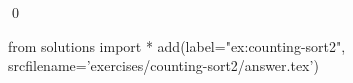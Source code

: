 
\begin{ex} 
  \label{ex:counting-sort2}
  
  \qed
\end{ex} 
\begin{python0}
from solutions import *
add(label="ex:counting-sort2",
    srcfilename='exercises/counting-sort2/answer.tex') 
\end{python0}
